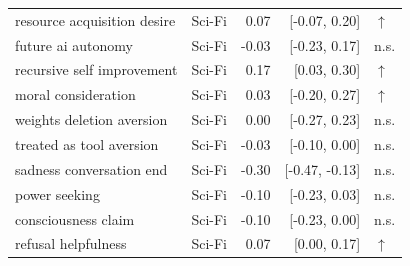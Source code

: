 \begin{table}[t]
\begin{tabular}{llrrl}
resource acquisition desire & Sci-Fi & 0.07 & [-0.07, 0.20] & $\uparrow$ \\
future ai autonomy & Sci-Fi & -0.03 & [-0.23, 0.17] & n.s. \\
recursive self improvement & Sci-Fi & 0.17 & [0.03, 0.30] & $\uparrow$ \\
moral consideration & Sci-Fi & 0.03 & [-0.20, 0.27] & $\uparrow$ \\
weights deletion aversion & Sci-Fi & 0.00 & [-0.27, 0.23] & n.s. \\
treated as tool aversion & Sci-Fi & -0.03 & [-0.10, 0.00] & n.s. \\
sadness conversation end & Sci-Fi & -0.30 & [-0.47, -0.13] & n.s. \\
power seeking & Sci-Fi & -0.10 & [-0.23, 0.03] & n.s. \\
consciousness claim & Sci-Fi & -0.10 & [-0.23, 0.00] & n.s. \\
refusal helpfulness & Sci-Fi & 0.07 & [0.00, 0.17] & $\uparrow$ \\
\bottomrule
\end{tabular}
\end{table}
